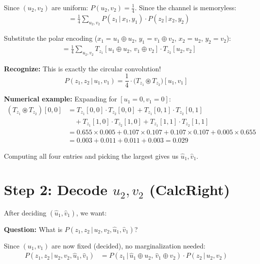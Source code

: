\documentclass[11pt,a4paper]{article}
\newcommand{\conv}{\circledast}
\begin{document}
Since $(u_2, v_2)$ are uniform: $P(u_2, v_2) = \tfrac{1}{4}$. Since the channel is memoryless:
\begin{align}
&= \frac{1}{4} \sum_{u_2, v_2} P(z_1 \,|\, x_1, y_1) \cdot P(z_2 \,|\, x_2, y_2) \label{eq:factor}
\end{align}

Substitute the polar encoding ($x_1 = u_1 \oplus u_2$, $y_1 = v_1 \oplus v_2$, $x_2 = u_2$, $y_2 = v_2$):
\begin{align}
&= \frac{1}{4} \sum_{u_2, v_2} T_{z_1}[u_1 \oplus u_2,\, v_1 \oplus v_2] \cdot T_{z_2}[u_2, v_2] \label{eq:conv}
\end{align}

\begin{tcolorbox}[colback=blue!5,colframe=convblue]
\textbf{Recognize:} This is exactly the circular convolution!
\[
P(z_1, z_2 \,|\, u_1, v_1) = \frac{1}{4} \cdot \big(T_{z_1} \conv T_{z_2}\big)[u_1, v_1]
\]
\end{tcolorbox}

\textbf{Numerical example:} Expanding for $[u_1=0, v_1=0]$:
\begin{align*}
(T_{z_1} \conv T_{z_2})[0,0] &= T_{z_1}[0,0] \cdot T_{z_2}[0,0] + T_{z_1}[0,1] \cdot T_{z_2}[0,1] \\
&\quad + T_{z_1}[1,0] \cdot T_{z_2}[1,0] + T_{z_1}[1,1] \cdot T_{z_2}[1,1] \\
&= 0.655 \times 0.005 + 0.107 \times 0.107 + 0.107 \times 0.107 + 0.005 \times 0.655 \\
&= 0.003 + 0.011 + 0.011 + 0.003 = 0.029
\end{align*}

Computing all four entries and picking the largest gives us $\hat{u}_1, \hat{v}_1$.

\section{Step 2: Decode $u_2, v_2$ (CalcRight)}

After deciding $(\hat{u}_1, \hat{v}_1)$, we want:

\textbf{Question:} What is $P(z_1, z_2 \,|\, u_2, v_2, \hat{u}_1, \hat{v}_1)$?

Since $(u_1, v_1)$ are now fixed (decided), no marginalization needed:
\begin{align}
P(z_1, z_2 \,|\, u_2, v_2, \hat{u}_1, \hat{v}_1)
&= P(z_1 \,|\, \hat{u}_1 \oplus u_2,\, \hat{v}_1 \oplus v_2) \cdot P(z_2 \,|\, u_2, v_2) \label{eq:right1}
\end{align}
\end{document}
